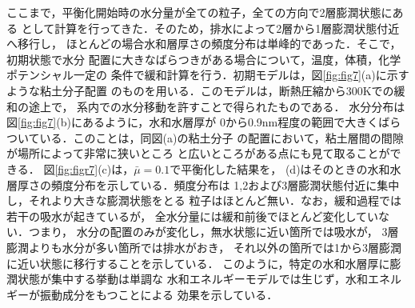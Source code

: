 ここまで，平衡化開始時の水分量が全ての粒子，全ての方向で2層膨潤状態にある
として計算を行ってきた．そのため，排水によって2層から1層膨潤状態付近へ移行し，
ほとんどの場合水和層厚さの頻度分布は単峰的であった．そこで，初期状態で水分
配置に大きなばらつきがある場合について，温度，体積，化学ポテンシャル一定の
条件で緩和計算を行う．初期モデルは，図\ref{fig:fig7}(a)に示すような粘土分子配置
のものを用いる．このモデルは，断熱圧縮から300Kでの緩和の途上で，
系内での水分移動を許すことで得られたものである．
水分分布は図\ref{fig:fig7}(b)にあるように，水和水層厚が
0から0.9nm程度の範囲で大きくばらついている．このことは，同図(a)の粘土分子
の配置において，粘土層間の間隙が場所によって非常に狭いところ
と広いところがある点にも見て取ることができる．
図\ref{fig:figr7}(c)は，$\bar{\mu}=0.1$で平衡化した結果を，
(d)はそのときの水和水層厚さの頻度分布を示している．頻度分布は
1,2および3層膨潤状態付近に集中し，それより大きな膨潤状態をとる
粒子はほとんど無い．なお，緩和過程では若干の吸水が起きているが，
全水分量には緩和前後でほとんど変化していない．つまり，
水分の配置のみが変化し，無水状態に近い箇所では吸水が，
3層膨潤よりも水分が多い箇所では排水がおき，
それ以外の箇所では1から3層膨潤に近い状態に移行することを示している．
このように，特定の水和水層厚に膨潤状態が集中する挙動は単調な
水和エネルギーモデルでは生じず，水和エネルギーが振動成分をもつことによる
効果を示している．

